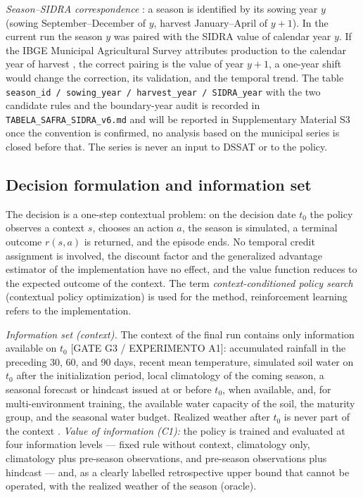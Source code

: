 \documentclass[times,final,authoryear]{elsarticle}
\begin{document}
\emph{Season--SIDRA correspondence} : a season is identified by its sowing year $y$ (sowing September--December of $y$, harvest January--April of $y+1$). In the current run the season $y$ was paired with the SIDRA value of calendar year $y$. If the IBGE Municipal Agricultural Survey attributes production to the calendar year of harvest , the correct pairing is the value of year $y+1$, a one-year shift would change the correction, its validation, and the temporal trend. The table \texttt{season\_id / sowing\_year / harvest\_year / SIDRA\_year} with the two candidate rules and the boundary-year audit is recorded in \texttt{TABELA\_SAFRA\_SIDRA\_v6.md} and will be reported in Supplementary Material S3 once the convention is confirmed, no analysis based on the municipal series is closed before that. The series is never an input to DSSAT or to the policy.


\subsection{Decision formulation and information set}
\label{subdecision}

The decision is a one-step contextual problem: on the decision date $t_0$ the policy observes a context $s$, chooses an action $a$, the season is simulated, a terminal outcome $r(s,a)$ is returned, and the episode ends. No temporal credit assignment is involved, the discount factor and the generalized advantage estimator of the implementation have no effect, and the value function reduces to the expected outcome of the context. The term \emph{context-conditioned policy search} (contextual policy optimization) is used for the method, reinforcement learning refers to the implementation. 

\emph{Information set (context).} The context of the final run contains only information available on $t_0$ [GATE G3 / EXPERIMENTO A1]: accumulated rainfall in the preceding 30, 60, and 90 days, recent mean temperature, simulated soil water on $t_0$ after the initialization period, local climatology of the coming season, a seasonal forecast or hindcast issued at or before $t_0$, when available, and, for multi-environment training, the available water capacity of the soil, the maturity group, and the seasonal water budget. Realized weather after $t_0$ is never part of the context . \emph{Value of information (C1):} the policy is trained and evaluated at four information levels --- fixed rule without context, climatology only, climatology plus pre-season observations, and pre-season observations plus hindcast --- and, as a clearly labelled retrospective upper bound that cannot be operated, with the realized weather of the season (oracle).
\end{document}
